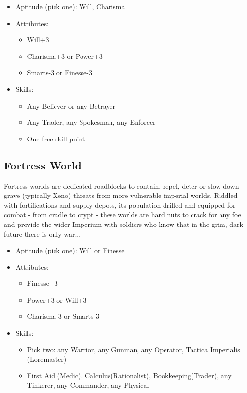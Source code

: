 \begin{itemize}
	\item Aptitude (pick one): Will, Charisma
	\item Attributes:
	\begin{itemize}
		\item Will+3
		\item Charisma+3 or Power+3
		\item Smarts-3 or Finesse-3
	\end{itemize}
	\item Skills: 
	\begin{itemize}
	 	\item Any Believer or any Betrayer
	 	\item Any Trader, any Spokesman, any Enforcer
	 	\item One free skill point
	 \end{itemize} 
\end{itemize}

\subsection{Fortress World}
Fortress worlds are dedicated roadblocks to contain, repel, deter or slow down grave (typically Xeno) threats from more vulnerable imperial worlds. Riddled with fortifications and supply depots, its population drilled and equipped for combat - from cradle to crypt - these worlds are hard nuts to crack for any foe and provide the wider Imperium with soldiers who know that in the grim, dark future there is only war...

\begin{itemize}
	\item Aptitude (pick one): Will or Finesse
	\item Attributes:
	\begin{itemize}
		\item Finesse+3
		\item Power+3 or Will+3
		\item Charisma-3 or Smarts-3
	\end{itemize}
	\item Skills: 
	\begin{itemize}
	 	\item Pick two: any Warrior, any Gunman, any Operator, Tactica Imperialis (Loremaster)
	 	\item First Aid (Medic), Calculus(Rationalist), Bookkeeping(Trader), any Tinkerer, any Commander, any Physical
	 \end{itemize} 
\end{itemize}

